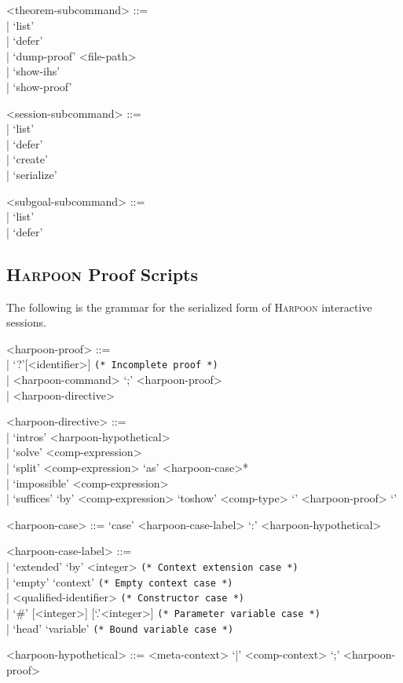 \documentclass[11pt]{article}
\newcommand{\Harpoon}{\textsc{Harpoon}\xspace}
\begin{document}
\begin{grammar}
<theorem-subcommand> ::= \hfill\\
| `list'\\
| `defer'\\
| `dump-proof' <file-path>\\
| `show-ihs'\\
| `show-proof'

<session-subcommand> ::= \hfill\\
| `list'\\
| `defer'\\
| `create'\\
| `serialize'

<subgoal-subcommand> ::= \hfill\\
| `list'\\
| `defer'
\end{grammar}

\subsection{\Harpoon Proof Scripts}\label{section:syntax-harpoon-proof-scripts}

The following is the grammar for the serialized form of \Harpoon interactive sessions.

\begin{grammar}
<harpoon-proof> ::= \hfill\\
| `?'[<identifier>] \hfill \texttt{(* Incomplete proof *)}\\
| <harpoon-command> `;' <harpoon-proof>\\
| <harpoon-directive>


<harpoon-directive> ::= \hfill\\
| `intros' <harpoon-hypothetical>\\
| `solve' <comp-expression>\\
| `split' <comp-expression> `as' <harpoon-case>*\\
| `impossible' <comp-expression>\\
| `suffices' `by' <comp-expression> `toshow' <comp-type> `{' <harpoon-proof> `}'

<harpoon-case> ::= `case' <harpoon-case-label> `:' <harpoon-hypothetical>

<harpoon-case-label> ::= \hfill\\
| `extended' `by' <integer> \hfill \texttt{(* Context extension case *)}\\
| `empty' `context' \hfill \texttt{(* Empty context case *)}\\
| <qualified-identifier> \hfill \texttt{(* Constructor case *)}\\
| `#' [<integer>] [`.'<integer>] \hfill \texttt{(* Parameter variable case *)}\\
| `head' `variable' \hfill \texttt{(* Bound variable case *)}

<harpoon-hypothetical> ::= <meta-context> `|' <comp-context> `;' <harpoon-proof>
\end{grammar}
\end{document}
